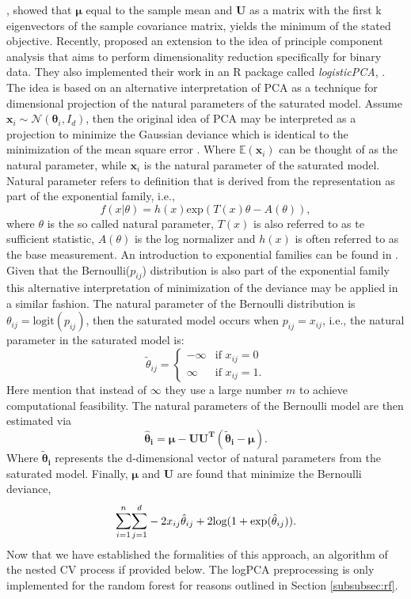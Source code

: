 \documentclass[a4paper,12pt, headsepline]{scrartcl}
\numberwithin{equation}{section}
\begin{document}
\citet{pearson01}, showed that $\bm \mu$ equal to the sample mean and $\bm U$ as a matrix with the first k eigenvectors of the sample covariance matrix, yields the minimum of the stated objective. Recently, \citet{landgraf2020} proposed an extension to the idea of principle component analysis that aims to perform dimensionality reduction specifically for binary data. They also implemented their work in an R package called \textit{logisticPCA}, \citet{logPCA}. The idea is based on an alternative interpretation of PCA as a technique for dimensional projection of the natural parameters of the saturated model. Assume $\bm x_{i} \sim \mathcal{N}(\bm \theta_i, I_d)$, then the original idea of PCA may be interpreted as a projection to minimize the Gaussian deviance which is identical to the minimization of the mean square error  \citep{collins01}. Where $\mathbb{E}(\bm x_i)$ can be thought of as the natural parameter, while $\bm x_i$ is the natural parameter of the saturated model. Natural parameter refers to definition that is derived from the representation as part of the exponential family, i.e., 
\[
f(x|\theta) = h(x) \text{exp}(T(x)\theta-A(\theta)),
\]
where $\theta$ is the so called natural parameter, $T(x)$ is also referred to as te sufficient statistic, $A(\theta)$ is the log normalizer and $h(x)$ is often referred to as the base measurement. An introduction to exponential families can be found in \citet{case01}. Given that the Bernoulli($p_{ij}$) distribution is also part of the exponential family this alternative interpretation of minimization of the deviance may be applied in a similar fashion. The natural parameter of the Bernoulli distribution is $\theta_{ij} = \text{logit}(p_{ij})$, then the saturated model occurs when $p_{ij} = x_{ij}$, i.e., the natural parameter in the saturated model is:
\begin{equation}
	\tilde{\theta}_{ij} =
	\begin{cases}
		-\infty & \text{if } x_{ij} = 0\\
		\infty & \text{if } x_{ij} = 1.
	\end{cases} 
\end{equation}
Here \citet{landgraf2020} mention that instead of $\infty$ they use a large number $m$ to achieve computational feasibility. The natural parameters of the Bernoulli model are then estimated via
\[
\bm{\hat \theta_i} =  \bm{\mu - UU^T(\tilde{\theta}_i-\mu)}.
\]
Where $\bm{\tilde{\theta}_i}$ represents the d-dimensional vector of natural parameters from the saturated model. Finally, $\bm \mu$ and $\bm U$ are found that minimize the Bernoulli deviance,
\[
 \mathlarger{\sum}\limits_{i = 1}^{n} \mathlarger{\sum}\limits_{j = 1}^{d} -2x_{ij}\hat{\theta}_{ij} + 2\text{log}(1 + \text{exp}(\hat{\theta}_{ij})).
\]
Now that we have established the formalities of this approach, an algorithm of the nested CV process if provided below. The logPCA preprocessing is only implemented for the random forest for reasons outlined in Section \ref{subsubsec:rf}.
\end{document}
